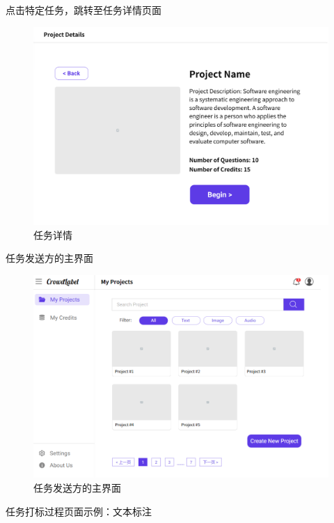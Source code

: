 \newpage

点击特定任务，跳转至任务详情页面

\begin{figure}[h!]
    \centering
    \includegraphics[width=\linewidth]{imgs/prototype/task_description.png}
    \caption{任务详情}
    \label{fig:proto_task_description}
\end{figure}

\newpage

任务发送方的主界面

\begin{figure}[h!]
    \centering
    \includegraphics[width=\linewidth]{imgs/prototype/myprojects.png}
    \caption{任务发送方的主界面}
    \label{fig:proto_myprojects}
\end{figure}

\newpage

任务打标过程页面示例：文本标注

